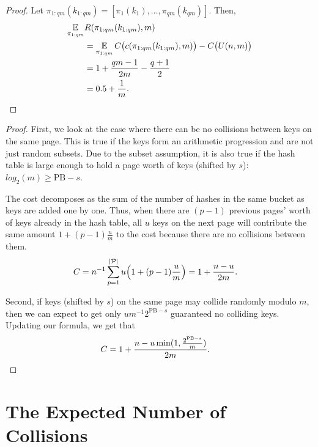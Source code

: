 \documentclass[sigconf]{acmart}
\DeclarePairedDelimiter{\abs}{\lvert}{\rvert}
\newcommand{\E}{\mathop{{}\mathbb{E}}}
\renewcommand{\label}[1]{%
    \gdef\sfname{sf:##1}}%
\begin{document}
\propexpectedregretofuh*
\begin{proof}
Let $\pi_{1:qm}(k_{1:qm}) = [\pi_1(k_1), \dots, \pi_{qm}(k_{qm})]$.
Then,
\begin{align*}
\E_{\pi_{1:qm}} &R(\pi_{1:qm}(k_{1:qm}), m)\\
&= \E_{\pi_{1:qm}} C\big(c(\pi_{1:qm}(k_{1:qm}),m)\big) - C\big(U(n,m)\big)\\
&= 1+\frac{qm-1}{2m} - \frac{q+1}{2}\\
&= 0.5 + \frac{1}{m}.
\qedhere
\end{align*}
\end{proof}

\propexpectedcostofpointermix*
\begin{proof}
First, we look at the case where there can be no collisions between keys on the same page.
This is true if the keys form an arithmetic progression and are not just random subsets.
Due to the subset assumption, it is also true if the hash table is large enough to hold a page worth of keys (shifted by $s$): $log_2(m) \geqslant \mathrm{PB} - s$.

The cost decomposes as the sum of the number of hashes in the same bucket as keys are added one by one.
Thus, when there are $(p-1)$ previous pages' worth of keys already in the hash table, all $u$ keys on the next page will contribute the same amount $1+(p-1)\frac{u}{m}$ to the cost because there are no collisions between them.
\begin{align*}
C &= n^{-1}\sum_{p=1}^{\abs{\mathcal{P}}} u\Big(1+(p-1)\frac{u}{m}\Big)
= 1+\frac{n-u}{2m}.
\end{align*}

Second, if keys (shifted by $s$) on the same page may collide randomly modulo $m$, then we can expect to get only $um^{-1}2^{\mathrm{PB} - s}$ guaranteed no colliding keys.
Updating our formula, we get that
\begin{align*}
C &= 1+\frac{n - u \min(1,\frac{2^{\mathrm{PB} - s}}{m})}{2m}.
\qedhere
\end{align*}
\end{proof}


\section{The Expected Number of Collisions}
\label{sec:number-of-collisions}
\end{document}
